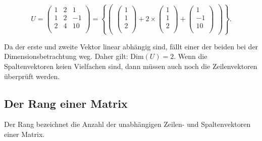\documentclass{scrartcl}
\begin{document}
\begin{equation}
	U = \begin{pmatrix*}
		1 & 2 & 1 \\
		1 & 2 & -1 \\
		2 & 4 & 10 \\
	\end{pmatrix*} = \left\{\begin{pmatrix*}
		\begin{pmatrix*}
			1\\
			1\\
			2\\
		\end{pmatrix*} +
		2\times \begin{pmatrix*}
			1\\
			1\\
			2\\
		\end{pmatrix*} +
		\begin{pmatrix*}
			1\\
			-1\\
			10\\
		\end{pmatrix*}
	\end{pmatrix*}\right\}.
\end{equation}

Da der erste und zweite Vektor linear abhängig sind, fällt einer der beiden bei der Dimensionsbetrachtung weg. Daher gilt: $\textrm{Dim}\left(U\right) = 2$.
Wenn die Spaltenvektoren keien Vielfachen sind, dann müssen auch noch die Zeilenvektoren überprüft werden.

\subsection{Der Rang einer Matrix}

Der Rang bezeichnet die Anzahl der unabhängigen Zeilen- und Spaltenvektoren einer Matrix.
\end{document}
